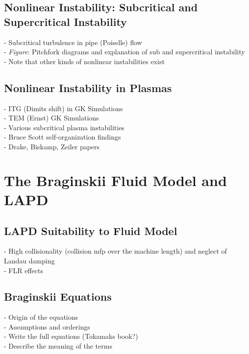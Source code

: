 \documentclass[12pt]{article}
\begin{document}
\subsection{Nonlinear Instability: Subcritical and Supercritical Instability}

- Subcritical turbulence in pipe (Poiselle) flow \\
- \emph{Figure}: Pitchfork diagrams and explanation of sub and supercritical instability \\
- Note that other kinds of nonlinear instabilities exist \\

\subsection{Nonlinear Instability in Plasmas}

- ITG (Dimits shift) in GK Simulations \\
- TEM (Ernst) GK Simulations \\
- Various subcritical plasma instabilities \\
- Bruce Scott self-organization findings \\
- Drake, Biskamp, Zeiler papers \\

\section{The Braginskii Fluid Model and LAPD}

\subsection{LAPD Suitability to Fluid Model}

- High collisionality (collision mfp over the machine length) and neglect of Landau damping \\
- FLR effects \\

\subsection{Braginskii Equations}

- Origin of the equations \\
- Assumptions and orderings \\
- Write the full equations (Tokamaks book?) \\
- Describe the meaning of the terms \\
\end{document}
